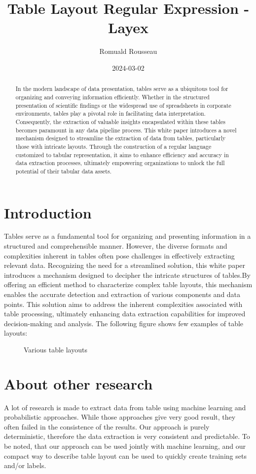 \documentclass{article}
\title{Table Layout Regular Expression - Layex}
\author{Romuald Rousseau}
\date{ 2024-03-02 }
\begin{document}
\maketitle

\begin{abstract}
In the modern landscape of data presentation, tables serve as a ubiquitous tool for organizing and conveying information
efficiently. Whether in the structured presentation of scientific findings or the widespread use of spreadsheets in
corporate environments, tables play a pivotal role in facilitating data interpretation. Consequently, the extraction of
valuable insights encapsulated within these tables becomes paramount in any data pipeline process. This white paper
introduces a novel mechanism designed to streamline the extraction of data from tables, particularly those with intricate
layouts. Through the construction of a regular language customized to tabular representation, it aims to enhance efficiency
and accuracy in data extraction processes, ultimately empowering organizations to unlock the full potential of their
tabular data assets.
\end{abstract}

\section{Introduction}
Tables serve as a fundamental tool for organizing and presenting information in a structured and comprehensible manner.
However, the diverse formats and complexities inherent in tables often pose challenges in effectively extracting relevant
data. Recognizing the need for a streamlined solution, this white paper introduces a mechanism designed to decipher the
intricate structures of tables.By offering an efficient method to characterize complex table layouts, this mechanism
enables the accurate detection and extraction of various components and data points. This solution aims to address the
inherent complexities associated with table processing, ultimately enhancing data extraction capabilities for improved
decision-making and analysis. The following figure shows few examples of table layouts:
\begin{figure}[H]
\caption{Various table layouts}

\end{figure}

\section{About other research}
A lot of research is made to extract data from table using machine learning and probabilistic approaches. While those
approaches give very good result, they often failed in the consistence of the results. Our approach is purely
deterministic, therefore the data extraction is very consistent and predictable. To be noted, that our approach can be
used jointly with machine learning, and our compact way to describe table layout can be used to quickly create training
sets and/or labels.
\end{document}
